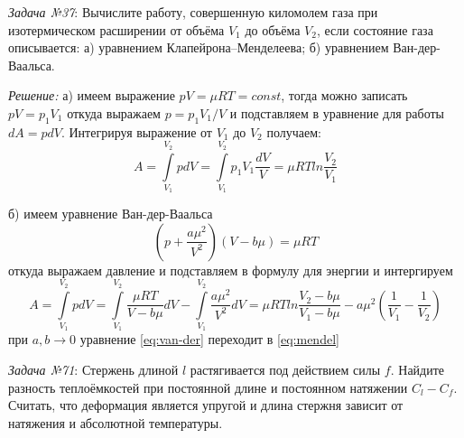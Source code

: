 \documentclass[14pt,final,titlepage,pscyr]{hedwork}
\begin{document}
\maketitle
\emph{Задача №37}: Вычислите работу, совершенную киломолем газа при 
изотермическом расширении от объёма \( V_1 \) до объёма \( V_2 \), если 
состояние газа описывается: а) уравнением Клапейрона--Менделеева; б) уравнением 
Ван-дер-Ваальса.

\emph{Решение:}
а) имеем выражение \( pV = \mu RT = const \), тогда можно записать 
\( pV = p_1 V_1 \) откуда выражаем \( p = p_1 V_1 / V \) и подставляем в 
уравнение для работы \( dA = pdV \). Интегрируя выражение от \( V_1 \) до 
\( V_2 \) получаем:
\begin{equation}
	A = \int\limits_{V_1}^{V_2} pdV = \int\limits_{V_1}^{V_2} p_1 V_1 
		\frac{dV}{V} = \mu RT ln\frac{V_2}{V_1}
	\label{eq:mendel}
\end{equation}

б) имеем уравнение Ван-дер-Ваальса
\[
	\left( p + \frac{a\mu^2}{V^2} \right)\left( V - b\mu \right) = \mu RT
\]
откуда выражаем давление и подставляем в формулу для энергии и интергируем
\begin{equation}
	A = \int\limits_{V_1}^{V_2} pdV = \int\limits_{V_1}^{V_2} 
		\frac{\mu RT}{V-b\mu} dV - \int\limits_{V_1}^{V_2} 
		\frac{a\mu^2}{V^2} dV = \mu RT ln\frac{V_2 - b\mu}{V_1 - b\mu} - 
		a\mu^2\left( \frac{1}{V_1} - \frac{1}{V_2}\right)
	\label{eq:van-der}
\end{equation}
при \( a,b \rightarrow 0 \) уравнение \eqref{eq:van-der} переходит в 
\eqref{eq:mendel}
\newpage

\emph{Задача №71}: Стержень длиной \( l \) растягивается под действием силы 
\( f \). Найдите разность теплоёмкостей при постоянной длине и постоянном 
натяжении \( C_l - C_f \). Считать, что деформация является упругой и длина 
стержня зависит от натяжения и абсолютной температуры.
\end{document}

